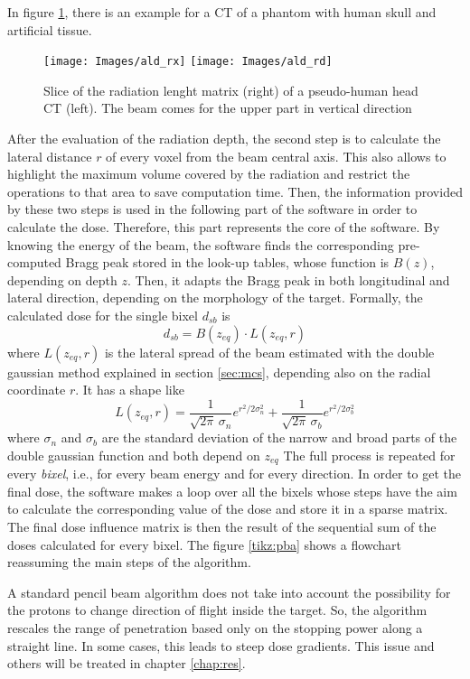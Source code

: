 \documentclass[12pt, a4paper, twoside]{book}
\begin{document}
In figure \ref{fig:rd}, there is an example for a CT of a phantom with human skull and artificial tissue.
\begin{figure}[!t]
\centering
\texttt{[image: Images/ald\_rx]}
\texttt{[image: Images/ald\_rd]}
\caption{Slice of the radiation lenght matrix (right) of a pseudo-human head CT (left). The beam comes for the upper part in vertical direction}
\label{fig:rd}
\end{figure}
After the evaluation of the radiation depth, the second step is to calculate the lateral distance  $r$ of every voxel from the beam central axis. This also allows to highlight the maximum volume covered by the radiation and restrict the operations to that area to save computation time. 
Then, the information provided by these two steps is used in the following part of the software in order to calculate the dose. Therefore, this part represents the core of the software. By knowing the energy of the beam, the software finds the corresponding pre-computed Bragg peak stored in the look-up tables, whose function is $B(z)$, depending on depth $z$. Then, it adapts the Bragg peak in both longitudinal and lateral direction, depending on the morphology of the target. 
Formally, the calculated dose for the single bixel $d_{sb}$ is 	
\[
d_{sb} = B(z_{eq}) \cdot L(z_{eq},r)
\]
where $L(z_{eq},r)$ is the lateral spread of the beam estimated with the double gaussian method explained in section \ref{sec:mcs}, depending also on the radial coordinate $r$. It has a shape like
\[
L(z_{eq},r) = \frac{1}{\sqrt{2\pi}\,\sigma_n}e^{r^2/2\sigma_n^2} + \frac{1}{\sqrt{2\pi}\,\sigma_b}e^{r^2/2\sigma_b^2} 
\]
where $\sigma_n$ and $\sigma_b$ are the standard deviation of the narrow and broad parts of the double gaussian function and both depend on $z_{eq}$
The full process is repeated for every \emph{bixel}, i.e., for every beam energy and for every direction. In order to get the final dose, the software makes a loop over all the bixels whose steps have the aim to calculate the corresponding value of the dose and store it in a sparse matrix. The final dose influence matrix is then the result of the sequential sum of the doses calculated for every bixel.
The figure \ref{tikz:pba} shows a flowchart reassuming the main steps of the algorithm.

A standard pencil beam algorithm does not take into account the possibility for the protons to change direction of flight inside the target. So, the algorithm rescales the range of penetration based only on the stopping power along a straight line. In some cases, this leads to steep dose gradients. This issue and others will be treated in chapter \ref{chap:res}.
\end{document}
